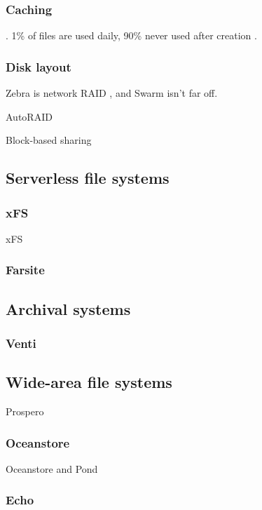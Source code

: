 \subsubsection{Caching}
\cite{dahlin94a}\cite{chaiken}\cite{blaze}\cite{dahlin94b}\cite{keleher}\cite{muthitacharoen}. 1\% of files are used daily, 90\% never used after creation \cite{gibson98b}.
\subsubsection{Disk layout}
Zebra \cite{hartman93} is network RAID \cite{patterson}, and Swarm \cite{hartman99} isn't far off.

AutoRAID \cite{wilkes95}

Block-based sharing \cite{mcgregor}

\subsection{Serverless file systems}
\cite{douceur01}\cite{douceur02}
\subsubsection{xFS}
xFS\cite{wang93,anderson95b,wang98}
\subsubsection{Farsite}
\cite{bolosky,adya}

\subsection{Archival systems}

\subsubsection{Venti}
\cite{quinlan}

\subsection{Wide-area file systems}
Prospero \cite{neuman}

\subsubsection{Oceanstore}
Oceanstore and Pond \cite{kubiatowicz,rhea}

\subsubsection{Echo}

